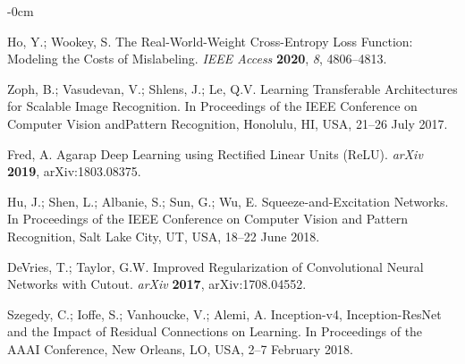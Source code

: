 \documentclass[sensors,article,accept,pdftex,moreauthors]{Definitions/mdpi}
\begin{document}
\begin{adjustwidth}{-\extralength}{0cm}
\begin{thebibliography}{999}
Ho, Y.; Wookey, S. The Real-World-Weight Cross-Entropy Loss Function: Modeling the Costs of Mislabeling.
\emph{IEEE Access }
{\bf 2020}, \emph{8}, 4806--4813.

Zoph, B.; Vasudevan, V.; Shlens, J.; Le, Q.V. Learning Transferable Architectures for Scalable Image Recognition. 
In Proceedings of the IEEE Conference on Computer Vision and{Pattern Recognition, }  Honolulu, HI, USA, 21--26 July 
{2017}.

Fred, A. Agarap Deep Learning using Rectified Linear Units (ReLU).
{\em arXiv} 
{\bf 2019}, arXiv:1803.08375.

Hu, J.; Shen, L.; Albanie, S.; Sun, G.; Wu, E. Squeeze-and-Excitation Networks.
In Proceedings of the IEEE Conference on Computer Vision and {Pattern Recognition,} Salt Lake City, UT, USA, 18--22 June 2018.

DeVries, T.; Taylor, G.W. Improved Regularization of Convolutional Neural Networks with Cutout. 
{\em arXiv} 
{\bf 2017}, arXiv:1708.04552.

Szegedy, C.; Ioffe, S.; Vanhoucke, V.; Alemi, A. Inception-v4, Inception-ResNet and the Impact of Residual Connections on Learning.
{In Proceedings of the AAAI Conference}, New Orleans, LO, USA,
2--7 February {2018}.

\end{thebibliography}



\end{adjustwidth}
%


\end{document}
